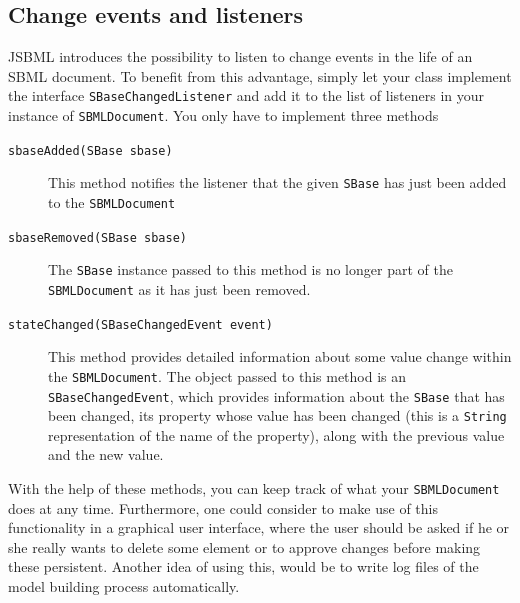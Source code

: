 \documentclass[
  BCOR12mm,
  letterpaper,
  11pt,
  headsepline,
  pointlessnumbers,
  tablecaptionabove,
  onelinecaption,
  headinclude,
  appendixprefix,
  idxtotoc,
  bibtotoc,
  twoside,
  titlepage
]{scrartcl}
\begin{document}
\subsection{Change events and listeners}

JSBML introduces the possibility to listen to change events in the life of an
SBML document. To benefit from this advantage, simply let your class implement
the interface \texttt{SBaseChangedListener} and add it to the list of listeners in
your instance of \texttt{SBMLDocument}. You only have to implement three methods
\begin{description}
 \item[\texttt{sbaseAdded(SBase sbase)}] This method notifies the listener that the given \texttt{SBase}
   has just been added to the \texttt{SBMLDocument}
 \item[\texttt{sbaseRemoved(SBase sbase)}] The \texttt{SBase} instance passed to this method is no
   longer part of the \texttt{SBMLDocument} as it has just been removed.
 \item[\texttt{stateChanged(SBaseChangedEvent event)}] This method provides detailed information about some value
   change within the \texttt{SBMLDocument}. The object passed to this method is
   an \texttt{SBaseChangedEvent}, which provides information about the \texttt{SBase}
   that has been changed, its property whose value has been changed (this is a
   \texttt{String} representation of the name of the property), along with the
   previous value and the new value.
\end{description}
With the help of these methods, you can keep track of what your
\texttt{SBMLDocument} does at any time. Furthermore, one could consider to make
use of this functionality in a graphical user interface, where the user should
be asked if he or she really wants to delete some element or to approve changes
before making these persistent. Another idea of using this, would be to write
log files of the model building process automatically.
\end{document}
